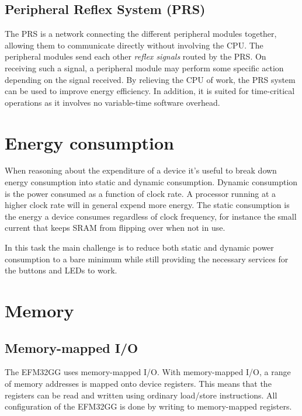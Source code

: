 \subsection{Peripheral Reflex System (PRS)}
The PRS is a network connecting the different peripheral modules together, allowing them to communicate directly without involving the CPU. The peripheral modules send each other \emph{reflex signals} routed by the PRS. On receiving such a signal, a peripheral module may perform some specific action depending on the signal received. By relieving the CPU of work, the PRS system can be used to improve energy efficiency. In addition, it is suited for time-critical operations as it involves no variable-time software overhead.



\section{Energy consumption}

When reasoning about the expenditure of a device it’s useful to break down energy consumption into static and dynamic consumption. Dynamic consumption is the power consumed as a function of clock rate. A processor running at a higher clock rate will in general expend more energy. The static consumption is the energy a device consumes regardless of clock frequency, for instance the small current that keeps SRAM from flipping over when not in use. 

In this task the main challenge is to reduce both static and dynamic power consumption to a bare minimum while still providing the necessary services for the buttons and LEDs to work.



\section{Memory}

\subsection{Memory-mapped I/O}
The EFM32GG uses memory-mapped I/O. With memory-mapped I/O, a range of memory addresses is mapped onto device registers. This means that the registers can be read and written using ordinary load/store instructions. All configuration of the EFM32GG is done by writing to memory-mapped registers.\cite{EFM32GG-RM}


